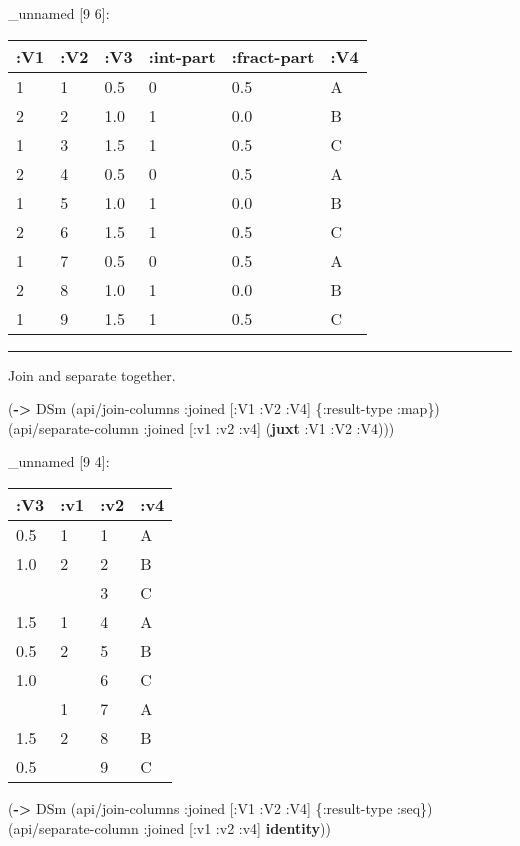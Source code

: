 \documentclass[]{article}
\newenvironment{Shaded}{\begin{snugshade}}{\end{snugshade}}
\newcommand{\AttributeTok}[1]{\textcolor[rgb]{0.77,0.63,0.00}{#1}}
\newcommand{\KeywordTok}[1]{\textcolor[rgb]{0.13,0.29,0.53}{\textbf{#1}}}
\newcommand{\NormalTok}[1]{#1}
\begin{document}
\_unnamed {[}9 6{]}:

\begin{longtable}[]{@{}llllll@{}}
\toprule
:V1 & :V2 & :V3 & :int-part & :fract-part & :V4\tabularnewline
\midrule
\endhead
1 & 1 & 0.5 & 0 & 0.5 & A\tabularnewline
2 & 2 & 1.0 & 1 & 0.0 & B\tabularnewline
1 & 3 & 1.5 & 1 & 0.5 & C\tabularnewline
2 & 4 & 0.5 & 0 & 0.5 & A\tabularnewline
1 & 5 & 1.0 & 1 & 0.0 & B\tabularnewline
2 & 6 & 1.5 & 1 & 0.5 & C\tabularnewline
1 & 7 & 0.5 & 0 & 0.5 & A\tabularnewline
2 & 8 & 1.0 & 1 & 0.0 & B\tabularnewline
1 & 9 & 1.5 & 1 & 0.5 & C\tabularnewline
\bottomrule
\end{longtable}

\begin{center}\rule{0.5\linewidth}{0.5pt}\end{center}

Join and separate together.

\begin{Shaded}
\begin{Highlighting}[]
\NormalTok{(}\KeywordTok{->}\NormalTok{ DSm}
\NormalTok{    (api/join-columns }\AttributeTok{:joined}\NormalTok{ [}\AttributeTok{:V1} \AttributeTok{:V2} \AttributeTok{:V4}\NormalTok{] \{}\AttributeTok{:result-type} \AttributeTok{:map}\NormalTok{\})}
\NormalTok{    (api/separate-column }\AttributeTok{:joined}\NormalTok{ [}\AttributeTok{:v1} \AttributeTok{:v2} \AttributeTok{:v4}\NormalTok{] (}\KeywordTok{juxt} \AttributeTok{:V1} \AttributeTok{:V2} \AttributeTok{:V4}\NormalTok{)))}
\end{Highlighting}
\end{Shaded}

\_unnamed {[}9 4{]}:

\begin{longtable}[]{@{}llll@{}}
\toprule
:V3 & :v1 & :v2 & :v4\tabularnewline
\midrule
\endhead
0.5 & 1 & 1 & A\tabularnewline
1.0 & 2 & 2 & B\tabularnewline
& & 3 & C\tabularnewline
1.5 & 1 & 4 & A\tabularnewline
0.5 & 2 & 5 & B\tabularnewline
1.0 & & 6 & C\tabularnewline
& 1 & 7 & A\tabularnewline
1.5 & 2 & 8 & B\tabularnewline
0.5 & & 9 & C\tabularnewline
\bottomrule
\end{longtable}

\begin{Shaded}
\begin{Highlighting}[]
\NormalTok{(}\KeywordTok{->}\NormalTok{ DSm}
\NormalTok{    (api/join-columns }\AttributeTok{:joined}\NormalTok{ [}\AttributeTok{:V1} \AttributeTok{:V2} \AttributeTok{:V4}\NormalTok{] \{}\AttributeTok{:result-type} \AttributeTok{:seq}\NormalTok{\})}
\NormalTok{    (api/separate-column }\AttributeTok{:joined}\NormalTok{ [}\AttributeTok{:v1} \AttributeTok{:v2} \AttributeTok{:v4}\NormalTok{] }\KeywordTok{identity}\NormalTok{))}
\end{Highlighting}
\end{Shaded}
\end{document}
